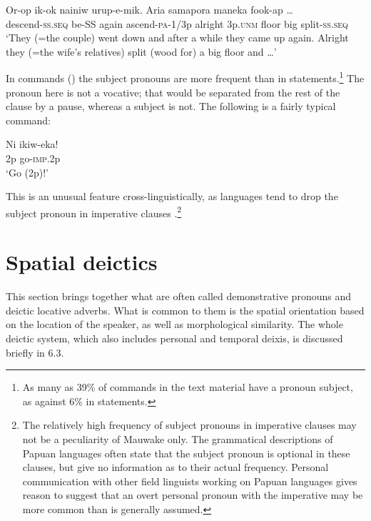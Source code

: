 \ea%
\label{ex:x1922}
\gll Or-op ik-ok nainiw urup-e-mik. Aria  samapora maneka fook-ap {\dots}\\
descend-\textsc{ss}.\textsc{seq} be-SS again ascend-\textsc{pa}-1/3p alright 3p.\textsc{unm} floor big split-\textsc{ss}.\textsc{seq} \\
\glt`They (=the couple) went down and after a while they came up again. Alright they (=the wife's relatives) split (wood for) a big floor and {\dots}'
\z

In commands () the subject pronouns are more frequent than in statements.\footnote{As many as 39\% of commands in the text material have a pronoun subject, as against 6\% in statements.} The pronoun here is not a vocative; that would be separated from the rest of the clause by a pause, whereas a subject is not. The following is a fairly typical command:

\ea%
\label{ex:x685}
\gll Ni ikiw-eka! \\
2p go-\textsc{imp}.2p\\
\glt`Go (2p)!'
\z

This is an unusual feature cross-linguistically, as languages tend to drop the subject pronoun in imperative clauses \citep[80]{Givon1979}.\footnote{The relatively high frequency of subject pronouns in imperative clauses may not be a peculiarity of Mauwake only. The grammatical descriptions of Papuan languages often state that the subject pronoun is optional in these clauses, but give no information as to their actual frequency. Personal communication with other field linguists working on Papuan languages gives reason to suggest that an overt personal pronoun with the imperative may be more common than is generally assumed.} 

\section{Spatial deictics}
{}
This section brings together what are often called demonstrative pronouns and deictic locative adverbs. What is common to them is the spatial orientation based on the location of the speaker, as well as morphological similarity. The whole deictic system, which also includes personal and temporal deixis, is discussed briefly in 6.3. 

